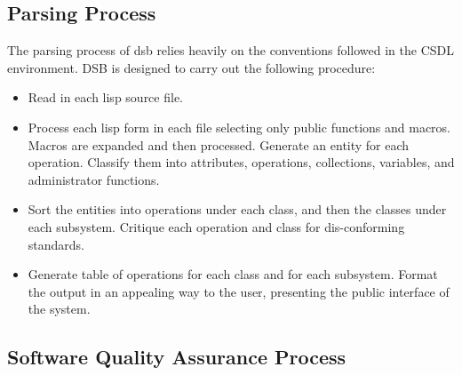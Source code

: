 \subsection{Parsing Process}

The parsing process of dsb relies heavily on the conventions followed
in the CSDL environment. DSB is designed to carry out the following
procedure:

\begin{itemize}
\item Read in each lisp source file.
\item Process each lisp form in each file selecting only public
  functions and macros.  Macros are expanded and then processed.
  Generate an entity for each operation.  Classify them into attributes,
  operations, collections, variables, and administrator functions.
\item Sort the entities into operations under each class, and then the
  classes under each subsystem.  Critique each operation and class for
  dis-conforming standards.
\item Generate table of operations for each class and for each
  subsystem.  Format the output in an appealing way to the user,
  presenting the public interface of the system.
\end{itemize}



\subsection{Software Quality Assurance Process}

